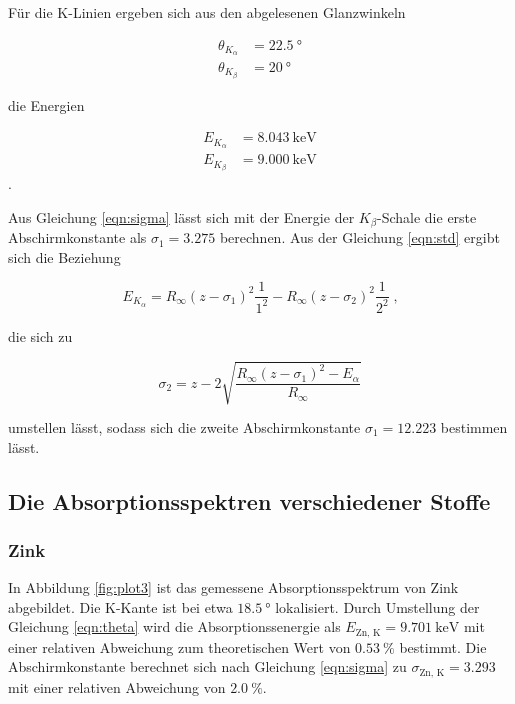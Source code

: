 Für die K-Linien ergeben sich aus den abgelesenen Glanzwinkeln 

\begin{align*}
  \theta_{K_\alpha} &= \SI{22.5}{\degree} \\
  \theta_{K_\beta} &= \SI{20}{\degree}
\end{align*}

die Energien 

\begin{align*}
E_{K_\alpha} &= \SI{8.043}{\kilo\eV} \\
E_{K_\beta} &= \SI{9.000}{\kilo\eV} 
\end{align*}.

Aus Gleichung \eqref{eqn:sigma} lässt sich mit der Energie der $K_\beta$-Schale
die erste Abschirmkonstante als $\sigma_1 = 3.275$ berechnen. Aus der Gleichung
\eqref{eqn:std} ergibt sich die Beziehung

\begin{equation}
  E_{K_\alpha} = R_\infty (z - \sigma_1)^2 \frac{1}{1^2} - R_\infty (z - \sigma_2)^2 \frac{1}{2^2}  \; \text{,}
\end{equation}

die sich zu

\begin{equation}
  \sigma_2 = z - 2 \sqrt{\frac{R_\infty (z - \sigma_1)^2 - E_\alpha}{R_\infty}}
\end{equation}

umstellen lässt, sodass sich die zweite Abschirmkonstante $\sigma_1 = 12.223$ bestimmen lässt.

\subsection{Die Absorptionsspektren verschiedener Stoffe}

\subsubsection{Zink}

In Abbildung \ref{fig:plot3} ist das gemessene Absorptionsspektrum von Zink abgebildet.
Die K-Kante ist bei etwa $\SI{18.5}{\degree}$ lokalisiert. Durch Umstellung 
der Gleichung \eqref{eqn:theta} wird die Absorptionssenergie als 
$ E_\text{Zn, K} = \SI{9.701}{\kilo\eV}$ mit einer relativen Abweichung
zum theoretischen Wert von $\SI{0.53}{\percent}$ bestimmt. Die Abschirmkonstante
berechnet sich nach Gleichung \eqref{eqn:sigma} zu $\sigma_\text{Zn, K} = 3.293$
mit einer relativen Abweichung von $\SI{2.0}{\percent}$.


